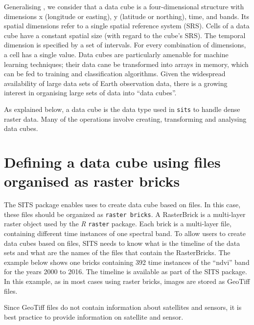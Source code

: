 \documentclass[a4paper,]{tufte-book}
\begin{document}
Generalising \citet{Appel2019}, we consider that a data cube is a four-dimensional structure with dimensions x (longitude or easting), y (latitude or northing), time, and bands. Its spatial dimensions refer to a single spatial reference system (SRS). Cells of a data cube have a constant spatial size (with regard to the cube's SRS). The temporal dimension is specified by a set of intervals. For every combination of dimensions, a cell has a single value. Data cubes are particularly amenable for machine learning techniques; their data cane be transformed into arrays in memory, which can be fed to training and classification algorithms. Given the widespread availability of large data sets of Earth observation data, there is a growing interest in organising large sets of data into ``data cubes''.

As explained below, a data cube is the data type used in \texttt{sits} to handle dense raster data. Many of the operations involve creating, transforming and analysing data cubes.

\hypertarget{defining-a-data-cube-using-files-organised-as-raster-bricks}{%
\section{Defining a data cube using files organised as raster bricks}\label{defining-a-data-cube-using-files-organised-as-raster-bricks}}

The SITS package enables uses to create data cube based on files. In this case, these files should be organized as \texttt{raster\ bricks}. A RasterBrick is a multi-layer raster object used by the \emph{R} \texttt{raster} package. Each brick is a multi-layer file, containing different time instances of one spectral band. To allow users to create data cubes based on files, SITS needs to know what is the timeline of the data sets and what are the names of the files that contain the RasterBricks. The example below shows one bricks containing 392 time instances of the ``ndvi'' band for the years 2000 to 2016. The timeline is available as part of the SITS package. In this example, as in most cases using raster bricks, images are stored as GeoTiff files.

Since GeoTiff files do not contain information about satellites and sensors, it is best practice to provide information on satellite and sensor.
\end{document}

